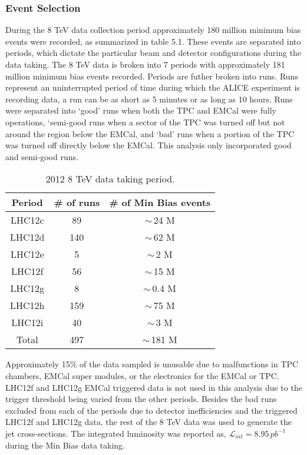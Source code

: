 \subsubsection{Event Selection}

During the 8 TeV data collection period approximately 180 million minimum bias events were recorded, as summarized in table 5.1.  These events are separated into periods, which dictate the particular beam and detector configurations during the data taking.  The 8 TeV data is broken into 7 periods with approximately 181 million minimum bias events recorded.  Periods are futher broken into runs.  Runs represent an uninterrupted period of time during which the ALICE experiment is recording data, a run can be as short as 5 minutes or as long as 10 hours.  Runs were separated into `good' runs when both the TPC and EMCal were fully operations, `semi-good runs when a sector of the TPC was turned off but not around the region below the EMCal, and `bad' runs when a portion of the TPC was turned off directly below the EMCal.  This analysis only incorporated good and semi-good runs.

\begin{table}[hb]
\label{tab:RunSummary}
\begin{center}
\begin{tabular}[b]{|c|c|c|}
	\hline
	Period & \# of runs & \# of Min Bias events \\ \hline
	LHC12c & 89 & $\sim \,$24 M \\ \hline
	LHC12d & 140 & $\sim \,$62 M \\ \hline
	LHC12e & 5 & $\sim \,$2 M \\ \hline
	LHC12f & 56 & $\sim \,$15 M \\ \hline
	LHC12g & 8 & $\sim \,$0.4 M \\ \hline
	LHC12h & 159 & $\sim \,$75 M \\ \hline
	LHC12i & 40 & $\sim \,$3 M \\ \hline
	Total & 497 & $\sim \,$181 M \\ \hline

\end{tabular}
\end{center}
\caption{2012 8 TeV data taking period.}
\end{table}

Approximately 15\% of the data sampled is unusable due to malfunctions in TPC chambers, EMCal super modules, or the electronics for the EMCal or TPC.  LHC12f  and LHC12g EMCal triggered data is not used in this analysis due to the trigger threshold being varied from the other periods.  Besides the bad runs excluded from each of the periods due to detector inefficiencies and the triggered LHC12f and LHC12g data, the rest of the 8 TeV data was used to generate the jet cross-sections.  The integrated luminosity was reported as, $\mathscr{L}_{int} = 8.95 \, pb^{-1}$ during the Min Bias data taking\cite{ALICE-PUBLIC-2017-002}.

